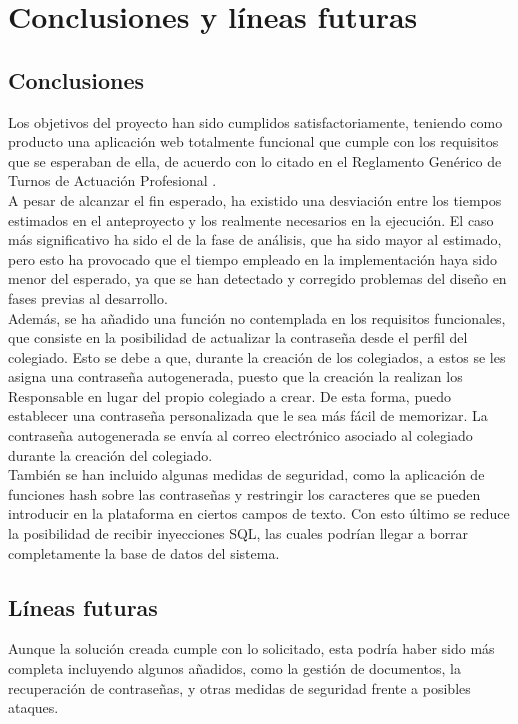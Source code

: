 \chapter{Conclusiones y l\'ineas futuras}

\section{Conclusiones}
Los objetivos del proyecto han sido cumplidos satisfactoriamente, teniendo como producto una aplicación web totalmente funcional que cumple con los requisitos que se esperaban de ella, de acuerdo con lo citado en el Reglamento Genérico de Turnos de Actuación Profesional \cite{reglamentotapcpiia}. \\

A pesar de alcanzar el fin esperado, ha existido una desviación entre los tiempos estimados en el anteproyecto y los realmente necesarios en la ejecución. El caso más significativo ha sido el de la fase de análisis, que ha sido mayor al estimado, pero esto ha provocado que el tiempo empleado en la implementación haya sido menor del esperado, ya que se han detectado y corregido problemas del diseño en fases previas al desarrollo. \\

Además, se ha añadido una función no contemplada en los requisitos funcionales, que consiste en la posibilidad de actualizar la contraseña desde el perfil del colegiado. Esto se debe a que, durante la creación de los colegiados, a estos se les asigna una contraseña autogenerada, puesto que la creación la realizan los Responsable en lugar del propio colegiado a crear. De esta forma, puedo establecer una contraseña personalizada que le sea más fácil de memorizar. La contraseña autogenerada se envía al correo electrónico asociado al colegiado durante la creación del colegiado.\\

También se han incluido algunas medidas de seguridad, como la aplicación de funciones hash sobre las contraseñas y restringir los caracteres que se pueden introducir en la plataforma en ciertos campos de texto. Con esto último se reduce la posibilidad de recibir inyecciones SQL, las cuales podrían llegar a borrar completamente la base de datos del sistema. \\



\section{L\'ineas futuras}
Aunque la solución creada cumple con lo solicitado, esta podría haber sido más completa incluyendo algunos añadidos, como la gestión de documentos, la recuperación de contraseñas, y otras medidas de seguridad frente a posibles ataques. \\

